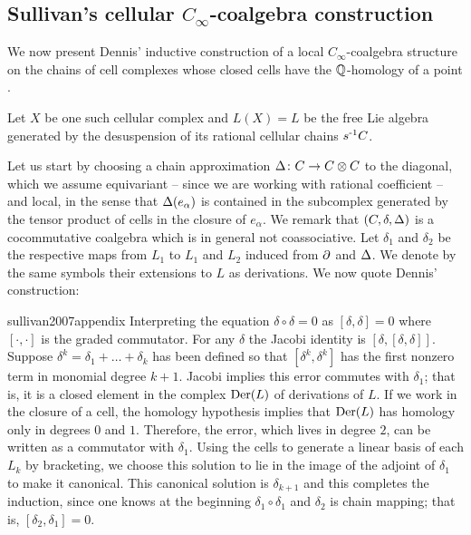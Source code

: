 \subsection{Sullivan's cellular $C_\infty$-coalgebra construction} \label{ss:dennis construction}

We now present Dennis' inductive construction of a local $C_\infty$-coalgebra structure on the chains of cell complexes whose closed cells have the $\mathbb{Q}$-homology of a point \cite{sullivan2007appendix}.

Let $X$ be one such cellular complex and $L(X) = L$ be the free Lie algebra generated by the desuspension of its rational cellular chains $s^{\mbox{\scriptsize -1}}C$.

Let us start by choosing a chain approximation $\operatorname{\Delta} \colon C \to C \otimes C$ to the diagonal, which we assume equivariant -- since we are working with rational coefficient -- and local, in the sense that $\operatorname{\Delta}(e_\alpha)$ is contained in the subcomplex generated by the tensor product of cells in the closure of $e_\alpha$.
We remark that $(C, \delta, \operatorname{\Delta})$ is a cocommutative coalgebra which is in general not coassociative.
Let $\delta_1$ and $\delta_2$ be the respective maps from $L_1$ to $L_1$ and $L_2$ induced from $\operatorname{\partial}$ and $\operatorname{\Delta}$.
We denote by the same symbols their extensions to $L$ as derivations.
We now quote Dennis' construction:

\begin{displaycquote}[p.251]{sullivan2007appendix}
	Interpreting the equation $\delta \circ \delta = 0$ as $[\delta, \delta] = 0$ where $[\cdot, \cdot]$ is the graded commutator.
	For any $\delta$ the Jacobi identity is $[\delta, [\delta, \delta]]$.
	Suppose $\delta^k = \delta_1 + \dots + \delta_k$ has been defined so that $[\delta^k, \delta^k]$ has the first nonzero term in monomial degree $k + 1$.
	Jacobi implies this error commutes with $\delta_1$; that is, it is a closed element in the complex $\mathrm{Der}(L)$ of derivations of $L$.
	If we work in the closure of a cell, the homology hypothesis implies that $\mathrm{Der}(L)$ has homology only in degrees $0$ and $1$.
	Therefore, the error, which lives in degree $2$, can be written as a commutator with $\delta_1$.
	Using the cells to generate a linear basis of each $L_k$ by bracketing, we choose this solution to lie in the image of the adjoint of $\delta_1$ to make it canonical.
	This canonical solution is $\delta_{k+1}$ and this completes the induction, since one knows at the beginning $\delta_1 \circ \delta_1$
	and $\delta_2$ is chain mapping; that is, $[\delta_2, \delta_1] = 0$.
\end{displaycquote}

